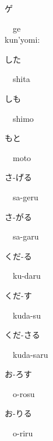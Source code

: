 \begin{multicols}{2}
{\hspace*{2em}}{\begin{CJK}{UTF8}{min} ゲ \end{CJK}}\ \ ge\ \ \\
{\hspace*{1em}}kun'yomi:\ \ \\
{\hspace*{2em}}{\begin{CJK}{UTF8}{min} した \end{CJK}}\ \ shita\ \ \\
{\hspace*{2em}}{\begin{CJK}{UTF8}{min} しも \end{CJK}}\ \ shimo\ \ \\
{\hspace*{2em}}{\begin{CJK}{UTF8}{min} もと \end{CJK}}\ \ moto\ \ \\
{\hspace*{2em}}{\begin{CJK}{UTF8}{min} さ-げる \end{CJK}}\ \ sa-geru\ \ \\
{\hspace*{2em}}{\begin{CJK}{UTF8}{min} さ-がる \end{CJK}}\ \ sa-garu\ \ \\
{\hspace*{2em}}{\begin{CJK}{UTF8}{min} くだ-る \end{CJK}}\ \ ku-daru\ \ \\
{\hspace*{2em}}{\begin{CJK}{UTF8}{min} くだ-す \end{CJK}}\ \ kuda-su\ \ \\
{\hspace*{2em}}{\begin{CJK}{UTF8}{min} くだ-さる \end{CJK}}\ \ kuda-saru\ \ \\
{\hspace*{2em}}{\begin{CJK}{UTF8}{min} お-ろす \end{CJK}}\ \ o-rosu\ \ \\
{\hspace*{2em}}{\begin{CJK}{UTF8}{min} お-りる \end{CJK}}\ \ o-riru\ \ \\

\end{multicols}
